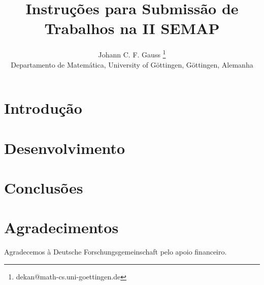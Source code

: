 \documentclass[a4]{report}
\begin{document}
\title{Instruções para Submissão de Trabalhos na II SEMAP}

\author{
 {\large  Johann C. F. Gauss }\thanks{dekan@math-cs.uni-goettingen.de}\\
 {\small Departamento de Matemática, University of Göttingen, Göttingen, Alemanha} \\
 }

\criartitulo


\section{ Introdução }

\lipsum[2-3]

\section{Desenvolvimento}

\lipsum[5-8]

\section{Conclusões}
\lipsum[15]

\section*{Agradecimentos}
Agradecemos à Deutsche Forschungsgemeinschaft pelo apoio financeiro.

\end{document}
